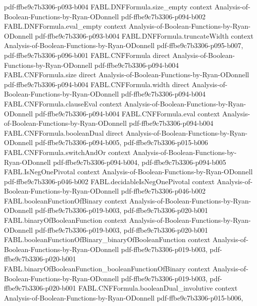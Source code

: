 \begin{theorem}
  {pdf-ffbe9c7b3306-p093-b004}
\proofstep
  {FABL.DNFFormula.size_empty}
  {context}
  {Analysis-of-Boolean-Functions-by-Ryan-ODonnell}
  {pdf-ffbe9c7b3306-p094-b002}
\proofstep
  {FABL.DNFFormula.eval_empty}
  {context}
  {Analysis-of-Boolean-Functions-by-Ryan-ODonnell}
  {pdf-ffbe9c7b3306-p093-b004}
\proofstep
  {FABL.DNFFormula.truncateWidth}
  {context}
  {Analysis-of-Boolean-Functions-by-Ryan-ODonnell}
  {pdf-ffbe9c7b3306-p095-b007,
    pdf-ffbe9c7b3306-p096-b001}
\proofstep
  {FABL.CNFFormula}
  {direct}
  {Analysis-of-Boolean-Functions-by-Ryan-ODonnell}
  {pdf-ffbe9c7b3306-p094-b004}
\proofstep
  {FABL.CNFFormula.size}
  {direct}
  {Analysis-of-Boolean-Functions-by-Ryan-ODonnell}
  {pdf-ffbe9c7b3306-p094-b004}
\proofstep
  {FABL.CNFFormula.width}
  {direct}
  {Analysis-of-Boolean-Functions-by-Ryan-ODonnell}
  {pdf-ffbe9c7b3306-p094-b004}
\proofstep
  {FABL.CNFFormula.clauseEval}
  {context}
  {Analysis-of-Boolean-Functions-by-Ryan-ODonnell}
  {pdf-ffbe9c7b3306-p094-b004}
\proofstep
  {FABL.CNFFormula.eval}
  {context}
  {Analysis-of-Boolean-Functions-by-Ryan-ODonnell}
  {pdf-ffbe9c7b3306-p094-b004}
\proofstep
  {FABL.CNFFormula.booleanDual}
  {direct}
  {Analysis-of-Boolean-Functions-by-Ryan-ODonnell}
  {pdf-ffbe9c7b3306-p094-b005,
    pdf-ffbe9c7b3306-p015-b006}
\proofstep
  {FABL.CNFFormula.switchAndOr}
  {context}
  {Analysis-of-Boolean-Functions-by-Ryan-ODonnell}
  {pdf-ffbe9c7b3306-p094-b004,
    pdf-ffbe9c7b3306-p094-b005}
\proofstep
  {FABL.IsNegOnePivotal}
  {context}
  {Analysis-of-Boolean-Functions-by-Ryan-ODonnell}
  {pdf-ffbe9c7b3306-p046-b002}
\proofstep
  {FABL.decidableIsNegOnePivotal}
  {context}
  {Analysis-of-Boolean-Functions-by-Ryan-ODonnell}
  {pdf-ffbe9c7b3306-p046-b002}
\proofstep
  {FABL.booleanFunctionOfBinary}
  {context}
  {Analysis-of-Boolean-Functions-by-Ryan-ODonnell}
  {pdf-ffbe9c7b3306-p019-b003,
    pdf-ffbe9c7b3306-p020-b001}
\proofstep
  {FABL.binaryOfBooleanFunction}
  {context}
  {Analysis-of-Boolean-Functions-by-Ryan-ODonnell}
  {pdf-ffbe9c7b3306-p019-b003,
    pdf-ffbe9c7b3306-p020-b001}
\proofstep
  {FABL.booleanFunctionOfBinary_binaryOfBooleanFunction}
  {context}
  {Analysis-of-Boolean-Functions-by-Ryan-ODonnell}
  {pdf-ffbe9c7b3306-p019-b003,
    pdf-ffbe9c7b3306-p020-b001}
\proofstep
  {FABL.binaryOfBooleanFunction_booleanFunctionOfBinary}
  {context}
  {Analysis-of-Boolean-Functions-by-Ryan-ODonnell}
  {pdf-ffbe9c7b3306-p019-b003,
    pdf-ffbe9c7b3306-p020-b001}
\proofstep
  {FABL.CNFFormula.booleanDual_involutive}
  {context}
  {Analysis-of-Boolean-Functions-by-Ryan-ODonnell}
  {pdf-ffbe9c7b3306-p015-b006,
}
\end{theorem}
